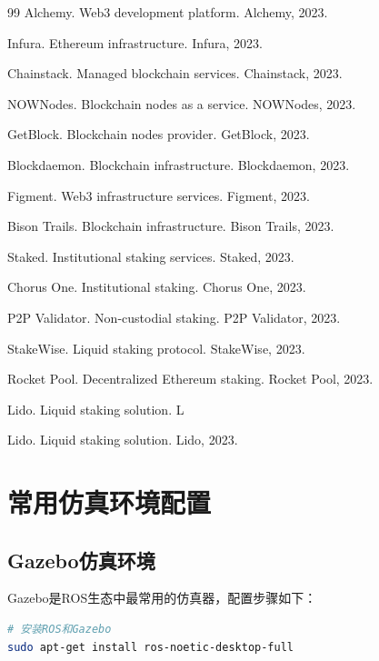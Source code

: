 \documentclass[12pt,a4paper]{ctexart}
\begin{document}
\begin{thebibliography}{99}
 Alchemy. Web3 development platform. Alchemy, 2023.

 Infura. Ethereum infrastructure. Infura, 2023.

 Chainstack. Managed blockchain services. Chainstack, 2023.

 NOWNodes. Blockchain nodes as a service. NOWNodes, 2023.

 GetBlock. Blockchain nodes provider. GetBlock, 2023.

 Blockdaemon. Blockchain infrastructure. Blockdaemon, 2023.

 Figment. Web3 infrastructure services. Figment, 2023.

 Bison Trails. Blockchain infrastructure. Bison Trails, 2023.

 Staked. Institutional staking services. Staked, 2023.

 Chorus One. Institutional staking. Chorus One, 2023.

 P2P Validator. Non-custodial staking. P2P Validator, 2023.

 StakeWise. Liquid staking protocol. StakeWise, 2023.

 Rocket Pool. Decentralized Ethereum staking. Rocket Pool, 2023.

 Lido. Liquid staking solution. L


 Lido. Liquid staking solution. Lido, 2023.

\appendix

\section{常用仿真环境配置}\label{app:sim_env}

\subsection{Gazebo仿真环境}

Gazebo是ROS生态中最常用的仿真器，配置步骤如下：

\begin{lstlisting}[language=bash, caption=Gazebo安装与配置]
# 安装ROS和Gazebo
sudo apt-get install ros-noetic-desktop-full


\end{lstlisting}
\end{thebibliography}
\end{document}

